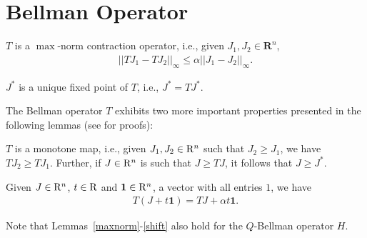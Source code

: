 \section{Bellman Operator}
\begin{lemma}\label{maxnorm}
$T$ is a $\max$-norm contraction operator, i.e., given $J_1, J_2 \in \mathbf{R}^n$,
\begin{align}
||TJ_1-TJ_2||_\infty\leq \alpha ||J_1-J_2||_\infty.
\end{align}
\end{lemma}
\begin{corollary}\label{uniquesol}
$J^*$ is a unique fixed point of $T$, i.e., $J^*=TJ^*$.
\end{corollary}
The Bellman operator $T$ exhibits two more important properties presented in the following lemmas (see \cite{BertB} for proofs):
\begin{lemma}\label{monotone}
$T$ is a monotone map, i.e., given $J_1,J_2 \in \mathrm{R}^n$ such that $J_2\geq J_1$, we have $T J_2\geq T J_1$. Further, if $J\in \mathrm{R}^n$ is such that $J\geq TJ$, it follows that $J\geq J^*$.
\end{lemma}
\begin{lemma}\label{shift}
Given $J\in \mathrm{R}^n$, $t \in \mathrm{R}$ and $\mathbf{1} \in \mathrm{R}^n$, a vector with all entries $1$, we have
\begin{align}
T(J+t\mathbf{1})=TJ+\alpha t\mathbf{1}.
\end{align}
\end{lemma}
Note that Lemmas~\ref{maxnorm}-\ref{shift} also hold for the $Q$-Bellman operator $H$.

